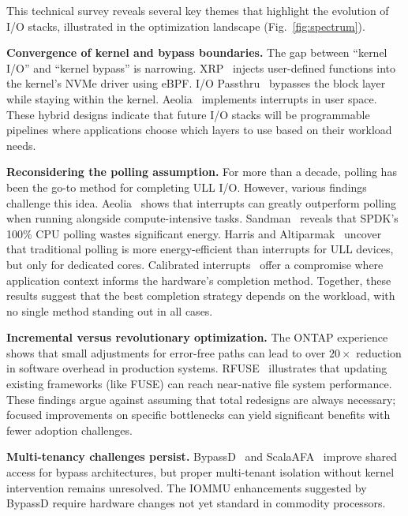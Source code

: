 \documentclass[conference]{IEEEtran}
\begin{document}
This technical survey reveals several key themes that highlight the evolution of I/O stacks, illustrated in the optimization landscape (Fig.~\ref{fig:spectrum}).

\textbf{Convergence of kernel and bypass boundaries.} The gap between ``kernel I/O'' and ``kernel bypass'' is narrowing. XRP~\cite{zhong2022xrp} injects user-defined functions into the kernel's NVMe driver using eBPF. I/O Passthru~\cite{joshi2024iopassthru} bypasses the block layer while staying within the kernel. Aeolia~\cite{zhou2025aeolia} implements interrupts in user space. These hybrid designs indicate that future I/O stacks will be programmable pipelines where applications choose which layers to use based on their workload needs.

\textbf{Reconsidering the polling assumption.} For more than a decade, polling has been the go-to method for completing ULL I/O. However, various findings challenge this idea. Aeolia~\cite{zhou2025aeolia} shows that interrupts can greatly outperform polling when running alongside compute-intensive tasks. Sandman~\cite{zhou2025sandman} reveals that SPDK's 100\% CPU polling wastes significant energy. Harris and Altiparmak~\cite{wang2022pollvsenergy} uncover that traditional polling is more energy-efficient than interrupts for ULL devices, but only for dedicated cores. Calibrated interrupts~\cite{yang2022calibrated} offer a compromise where application context informs the hardware's completion method. Together, these results suggest that the best completion strategy depends on the workload, with no single method standing out in all cases.

\textbf{Incremental versus revolutionary optimization.} The ONTAP experience~\cite{curtismaury2024ontap} shows that small adjustments for error-free paths can lead to over $20\times$ reduction in software overhead in production systems. RFUSE~\cite{rfuse2024} illustrates that updating existing frameworks (like FUSE) can reach near-native file system performance. These findings argue against assuming that total redesigns are always necessary; focused improvements on specific bottlenecks can yield significant benefits with fewer adoption challenges.

\textbf{Multi-tenancy challenges persist.} BypassD~\cite{yadalam2024bypassd} and ScalaAFA~\cite{lee2023scalaafa} improve shared access for bypass architectures, but proper multi-tenant isolation without kernel intervention remains unresolved. The IOMMU enhancements suggested by BypassD require hardware changes not yet standard in commodity processors.
\end{document}
